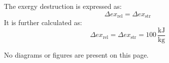 The exergy destruction is expressed as:  
\[
\Delta ex_{\text{rel}} = \Delta ex_{\text{str}}
\]  
It is further calculated as:  
\[
\Delta ex_{\text{rel}} = \Delta ex_{\text{str}} = 100 \, \frac{\text{kJ}}{\text{kg}}
\]  

No diagrams or figures are present on this page.